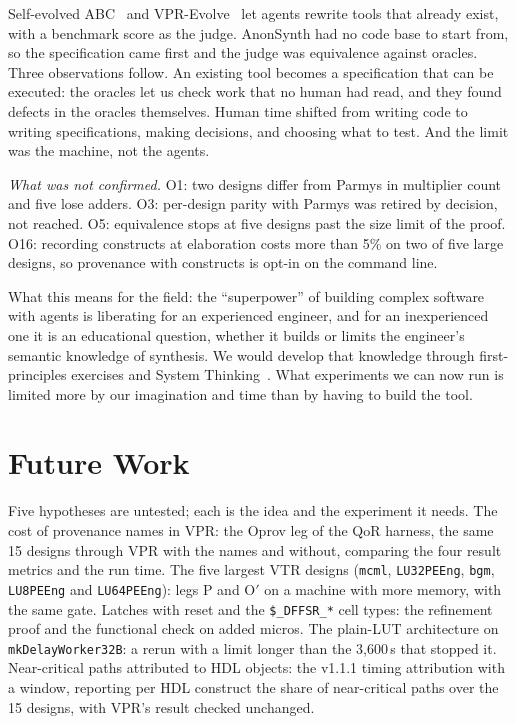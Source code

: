 \documentclass[conference]{IEEEtran}
\newcommand{\code}[1]{\texttt{#1}}
\begin{document}
Self-evolved ABC~\cite{yu2026selfevolvedabc} and VPR-Evolve~\cite{wu2026vprevolve} let agents rewrite tools that already exist, with a benchmark score as the judge. AnonSynth had no code base to start from, so the specification came first and the judge was equivalence against oracles. Three observations follow. An existing tool becomes a specification that can be executed: the oracles let us check work that no human had read, and they found defects in the oracles themselves. Human time shifted from writing code to writing specifications, making decisions, and choosing what to test. And the limit was the machine, not the agents.

\emph{What was not confirmed.} O1: two designs differ from Parmys in multiplier count and five lose adders. O3: per-design parity with Parmys was retired by decision, not reached. O5: equivalence stops at five designs past the size limit of the proof. O16: recording constructs at elaboration costs more than 5\% on two of five large designs, so provenance with constructs is opt-in on the command line.

What this means for the field: the ``superpower'' of building complex software with agents is liberating for an experienced engineer, and for an inexperienced one it is an educational question, whether it builds or limits the engineer's semantic knowledge of synthesis. We would develop that knowledge through first-principles exercises and System Thinking~\cite{cabrera2015systems}. What experiments we can now run is limited more by our imagination and time than by having to build the tool.

\section{Future Work}
\label{sec:future}

Five hypotheses are untested; each is the idea and the experiment it needs. The cost of provenance names in VPR: the Oprov leg of the QoR harness, the same 15 designs through VPR with the names and without, comparing the four result metrics and the run time. The five largest VTR designs (\code{mcml}, \code{LU32PEEng}, \code{bgm}, \code{LU8PEEng} and \code{LU64PEEng}): legs P and O$'$ on a machine with more memory, with the same gate. Latches with reset and the \code{\$\_DFFSR\_*} cell types: the refinement proof and the functional check on added micros. The plain-LUT architecture on \code{mkDelayWorker32B}: a rerun with a limit longer than the 3,600\,s that stopped it. Near-critical paths attributed to HDL objects: the v1.1.1 timing attribution with a window, reporting per HDL construct the share of near-critical paths over the 15 designs, with VPR's result checked unchanged.
\end{document}
